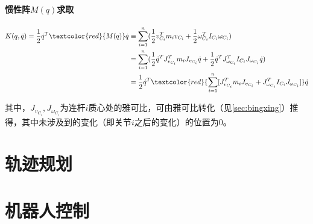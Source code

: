 \documentclass[
12pt, %
a4paper, 
oneside, %
headinclude,footinclude, %
]{scrartcl}
\begin{document}
\paragraph{惯性阵$ M(q) $求取}\label{sec:bingxing_back2}
\begin{align*}
K(q, \dot{q}) = \frac{1}{2}\dot{q}^T \textcolor{red}{M(q)} \dot{q} &\equiv \sum_{i=1}^{n}(\frac{1}{2}v_{C_i}^T m_i v_{C_i} + \frac{1}{2}\omega_{C_i}^T I_{C_i}\omega_{C_i}) \\
&= \sum_{i = 1}^{n}(\frac{1}{2}\dot{q}^T J_{v_{C_i}}^T m_i J_{v_{C_i}} \dot{q} + \frac{1}{2}\dot{q}^T J_{\omega_{C_i}}^T I_{C_i} J_{\omega_{C_i}} \dot{q}) \\
&= \frac{1}{2}\dot{q}^T \textcolor{red}{\sum_{i = 1}^{n}[J_{v_{C_i}}^T m_i J_{v_{C_i}} + J_{\omega_{C_i}}^T I_{C_i} J_{\omega_{C_i}}]} \dot{q}
\end{align*}

其中，$ J_{v_{C_i}},J_{\omega_{C_i}} $为连杆$ i $质心处的雅可比，可由雅可比转化（见\ref{sec:bingxing}）推得，其中未涉及到的变化（即关节$ i $之后的变化）的位置为$ 0 $。
\section{轨迹规划}
\section{机器人控制}
\end{document}

